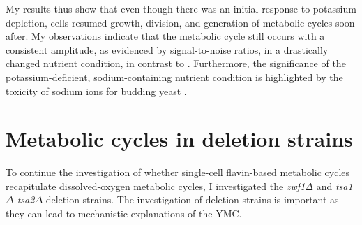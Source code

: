 My results thus show that even though there was an initial response to potassium depletion, cells resumed growth, division, and generation of metabolic cycles soon after.
My observations indicate that the metabolic cycle still occurs with a consistent amplitude, as evidenced by signal-to-noise ratios, in a drastically changed nutrient condition, in contrast to \textcite{oneillEukaryoticCellBiology2020}.
Furthermore, the significance of the potassium-deficient, sodium-containing nutrient condition is highlighted by the toxicity of sodium ions for budding yeast \parencite{arinoAlkaliMetalCation2010,caseyEffectSaltsCofermentation2013,watcharawipasSodiumAcetateResponses2018}.


\section{Metabolic cycles in deletion strains}
\label{sec:biology-deletions}


To continue the investigation of whether single-cell flavin-based metabolic cycles recapitulate dissolved-oxygen metabolic cycles, I investigated the \textit{zwf1$\Delta$} and \textit{tsa1$\Delta$ tsa2$\Delta$} deletion strains.
The investigation of deletion strains is important as they can lead to mechanistic explanations of the YMC\@.

